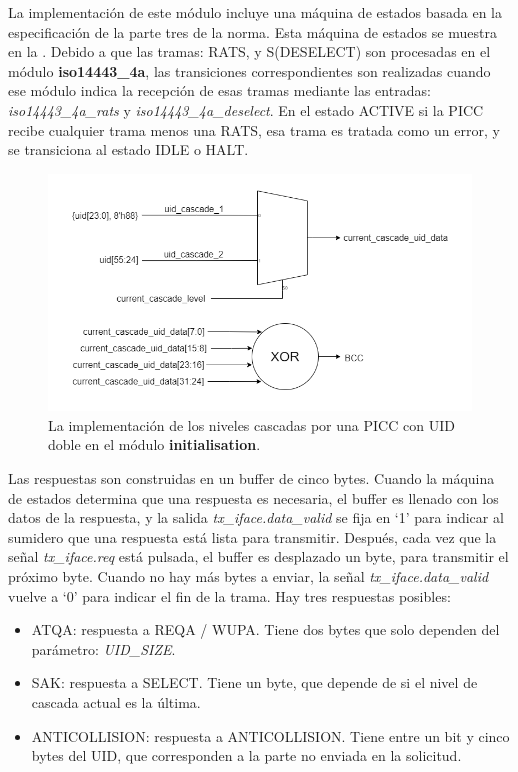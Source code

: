 \documentclass[a4paper, twoside, 11pt]{report}
\begin{document}
La implementación de este módulo incluye una máquina de estados basada en la especificación de la parte tres de la norma. Esta máquina de estados se muestra en la . Debido a que las tramas: RATS, y S(DESELECT) son procesadas en el módulo \textbf{iso14443\_4a}, las transiciones correspondientes son realizadas cuando ese módulo indica la recepción de esas tramas mediante las entradas: \textit{iso14443\_4a\_rats} y \textit{iso14443\_4a\_deselect}. En el estado ACTIVE si la PICC recibe cualquier trama menos una RATS, esa trama es tratada como un error, y se transiciona al estado IDLE o HALT.

\begin{figure}[htb]
  \centering
  \includegraphics[width=1.0\textwidth]{./img/initialisation_uid.drawio}
  \caption{La implementación de los niveles cascadas por una PICC con UID doble en el módulo \textbf{initialisation}.}
  \label{fig:init_cascade_levels}
\end{figure}

Las respuestas son construidas en un buffer de cinco bytes. Cuando la máquina de estados determina que una respuesta es necesaria, el buffer es llenado con los datos de la respuesta,  y la salida \textit{tx\_iface.data\_valid} se fija en ‘1’ para indicar al sumidero que una respuesta está lista para transmitir. Después, cada vez que la señal \textit{tx\_iface.req} está pulsada, el buffer es desplazado un byte, para transmitir el próximo byte. Cuando no hay más bytes a enviar, la señal \textit{tx\_iface.data\_valid} vuelve a ‘0’ para indicar el fin de la trama. Hay tres respuestas posibles:

\begin{itemize}
  \item ATQA: respuesta a REQA / WUPA. Tiene dos bytes que solo dependen del parámetro: \textit{UID\_SIZE}.
  \item SAK: respuesta a SELECT. Tiene un byte, que depende de si el nivel de cascada actual es la última.
  \item ANTICOLLISION: respuesta a ANTICOLLISION. Tiene entre un bit y cinco bytes del UID, que corresponden a la parte no enviada en la solicitud.
\end{itemize}
\end{document}
